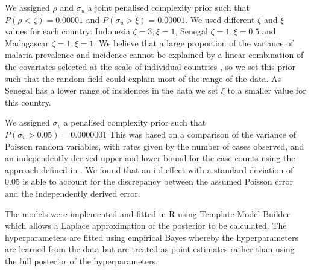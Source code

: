 \documentclass{statsoc}
\begin{document}
We assigned $\rho$ and $\sigma_u$ a joint penalised complexity prior \citep{fuglstad2018constructing} such that $P(\rho < \zeta) = 0.00001$ and $P(\sigma_u > \xi) = 0.00001$.
We used different $\zeta$  and $\xi$ values for each country: Indonesia $\zeta = 3, \xi = 1$, Senegal $\zeta = 1, \xi = 0.5$ and Madagascar $\zeta = 1, \xi = 1$.
We believe that a large proportion of the variance of malaria prevalence and incidence cannot be explained by a linear combination of the covariates selected at the scale of individual countries \citep{bhatt2017improved}, so we set this prior such that the random field could explain most of the range of the data.
As Senegal has a lower range of incidences in the data we set $\xi$ to a smaller value for this country.

We assigned $\sigma_v$ a penalised complexity prior \citep{simpson2017penalising} such that $P(\sigma_v > 0.05) = 0.0000001$
This was based on a comparison of the variance of Poisson random variables, with rates given by the number of cases observed, and an independently derived upper and lower bound for the case counts using the approach defined in \citep{cibulskis2011worldwide}.
We found that an iid effect with a standard deviation of 0.05 is able to account for the discrepancy between the assumed Poisson error and the independently derived error.


The models were implemented and fitted in R \citep{R} using Template Model Builder \citep{TMB} which allows a Laplace approximation of the posterior to be calculated.
The hyperparameters are fitted using empirical Bayes whereby the hyperparameters are learned from the data but are treated as point estimates rather than using the full posterior of the hyperparameters.

%
%
%
%
%
%
%
\end{document}
